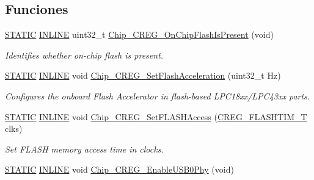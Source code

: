 \subsection*{Funciones}
\begin{DoxyCompactItemize}
\item 
\hyperlink{group___l_p_c___types___public___macros_ga10b2d890d871e1489bb02b7e70d9bdfb}{S\+T\+A\+T\+IC} \hyperlink{spifi__18xx__43xx_8h_a2eb6f9e0395b47b8d5e3eeae4fe0c116}{I\+N\+L\+I\+NE} uint32\+\_\+t \hyperlink{group___c_r_e_g__18_x_x__43_x_x_gaa6600641bde2e510902377f8c62dec80}{Chip\+\_\+\+C\+R\+E\+G\+\_\+\+On\+Chip\+Flash\+Is\+Present} (void)
\begin{DoxyCompactList}\small\item\em Identifies whether on-\/chip flash is present. \end{DoxyCompactList}\item 
\hyperlink{group___l_p_c___types___public___macros_ga10b2d890d871e1489bb02b7e70d9bdfb}{S\+T\+A\+T\+IC} \hyperlink{spifi__18xx__43xx_8h_a2eb6f9e0395b47b8d5e3eeae4fe0c116}{I\+N\+L\+I\+NE} void \hyperlink{group___c_r_e_g__18_x_x__43_x_x_gabe245d16e605579542492b553eb482ee}{Chip\+\_\+\+C\+R\+E\+G\+\_\+\+Set\+Flash\+Acceleration} (uint32\+\_\+t Hz)
\begin{DoxyCompactList}\small\item\em Configures the onboard Flash Accelerator in flash-\/based L\+P\+C18xx/\+L\+P\+C43xx parts. \end{DoxyCompactList}\item 
\hyperlink{group___l_p_c___types___public___macros_ga10b2d890d871e1489bb02b7e70d9bdfb}{S\+T\+A\+T\+IC} \hyperlink{spifi__18xx__43xx_8h_a2eb6f9e0395b47b8d5e3eeae4fe0c116}{I\+N\+L\+I\+NE} void \hyperlink{group___c_r_e_g__18_x_x__43_x_x_ga8135e31d06c710b645e0752ec909308d}{Chip\+\_\+\+C\+R\+E\+G\+\_\+\+Set\+F\+L\+A\+S\+H\+Access} (\hyperlink{group___c_r_e_g__18_x_x__43_x_x_gaecbf266e1dc43b19d1cca3b7cc800786}{C\+R\+E\+G\+\_\+\+F\+L\+A\+S\+H\+T\+I\+M\+\_\+T} clks)
\begin{DoxyCompactList}\small\item\em Set F\+L\+A\+SH memory access time in clocks. \end{DoxyCompactList}\item 
\hyperlink{group___l_p_c___types___public___macros_ga10b2d890d871e1489bb02b7e70d9bdfb}{S\+T\+A\+T\+IC} \hyperlink{spifi__18xx__43xx_8h_a2eb6f9e0395b47b8d5e3eeae4fe0c116}{I\+N\+L\+I\+NE} void \hyperlink{group___c_r_e_g__18_x_x__43_x_x_gad0c399884bc0c82c8f38832eb7dee9c9}{Chip\+\_\+\+C\+R\+E\+G\+\_\+\+Enable\+U\+S\+B0\+Phy} (void)

\end{DoxyCompactItemize}
